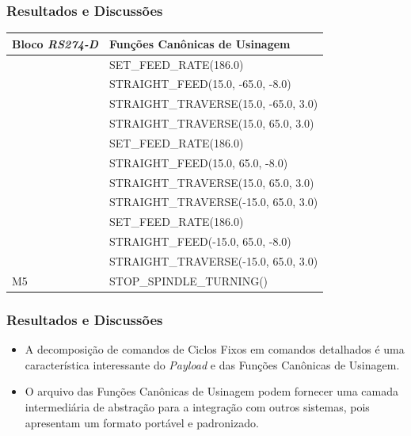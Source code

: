 \documentclass[aspectratio=169]{beamer}
\begin{document}
{\begin{frame}[fragile]
\begin{tabular}{ |l|l| }
\end{tabular}  

\end{frame}


\begin{frame}[fragile]
  \frametitle{Resultados e Discussões}

  \begin{tabular}{ |l|l| }

    \hline
    \scriptsize{\bfseries{Bloco \emph{RS274-D}}} & 
    \scriptsize{\bfseries{Funções Canônicas de Usinagem}} \\
    \hline

    & \scriptsize{SET\_FEED\_RATE(186.0)} \\
    & \scriptsize{STRAIGHT\_FEED(15.0, -65.0, -8.0)} \\
    & \scriptsize{STRAIGHT\_TRAVERSE(15.0, -65.0, 3.0)} \\
    & \scriptsize{STRAIGHT\_TRAVERSE(15.0, 65.0, 3.0)} \\
    & \scriptsize{SET\_FEED\_RATE(186.0)} \\
    & \scriptsize{STRAIGHT\_FEED(15.0, 65.0, -8.0)} \\
    & \scriptsize{STRAIGHT\_TRAVERSE(15.0, 65.0, 3.0)} \\
    & \scriptsize{STRAIGHT\_TRAVERSE(-15.0, 65.0, 3.0)} \\

    & \scriptsize{SET\_FEED\_RATE(186.0)} \\
    & \scriptsize{STRAIGHT\_FEED(-15.0, 65.0, -8.0)} \\
    & \scriptsize{STRAIGHT\_TRAVERSE(-15.0, 65.0, 3.0)} \\

    \hline
    \scriptsize{M5} & \scriptsize{STOP\_SPINDLE\_TURNING()} \\
    \hline

  \end{tabular}  

\end{frame}


\begin{frame}[fragile]
  \frametitle{Resultados e Discussões}

  \begin{itemize}
    \item A decomposição de comandos de Ciclos Fixos em comandos 
          detalhados é uma característica interessante do \emph{Payload} 
          e das Funções Canônicas de Usinagem.
    \item O arquivo das Funções Canônicas de Usinagem podem fornecer uma 
          camada intermedi\'aria de abstra\c c\~ao para a integração 
          com outros sistemas, pois apresentam um formato port\'avel e 
          padronizado.
  \end{itemize}
  

\end{frame}}
\end{document}
